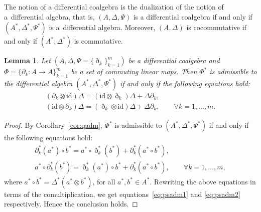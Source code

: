 \documentclass[10pt,a4paper]{amsart}
\numberwithin{equation}{section}
\newtheorem{Lemma}[Theorem]{Lemma}
\newcommand{\id}{\mathrm{id}}
\begin{document}
\begin{Remark}
 The notion of a differential coalgebra is the dualization of the notion of a~differential algebra, that is, $(A, \Delta, \Psi)$ is a differential coalgebra if and only if $(A^*, \Delta^*, \Psi^*)$ is a~differential algebra.
 Moreover, $(A,\Delta)$ is cocommutative if and only if
 $(A^*,\Delta^*)$ is commutative.
\end{Remark}

\begin{Lemma}\label{lem:coadm}
 Let $(A, \Delta, \Psi = \{\eth_k\}_{k=1}^m)$ be a differential coalgebra and
 $\Phi = \{\partial_k\colon A \to A\}_{k=1}^m$ be a set of commuting linear maps.
 Then $\Phi^*$ is admissible to the differential algebra $(A^*, \Delta^*, \Psi^*)$ if and only
 if the following equations hold:
 \begin{gather}
 (\partial_k \otimes \id) \Delta = (\id \otimes \eth_k) \Delta + \Delta \partial_k, \label{eq:psadm1} \\
 (\id \otimes \partial_k) \Delta = (\eth_k \otimes \id) \Delta + \Delta \partial_k, \qquad \forall k=1, \dots, m. \label{eq:psadm2}
 \end{gather}
\end{Lemma}
\begin{proof}
By Corollary~\ref{cor:qadm}, $\Phi^*$ is admissible to $(A^*, \Delta^*, \Psi^*)$ if and only if the following equations hold:
\begin{gather*}
	\partial_k^*(a^*) \circ b^* = a^* \circ \eth_k^*(b^*) + \partial_k^*(a^* \circ b^*), \\
 a^* \circ \partial_k^*(b^*) = \eth_k^*(a^*) \circ b^* + \partial_k^*(a^* \circ b^*), \qquad \forall k=1, \dots, m,
\end{gather*}
where $a^* \circ b^* = \Delta^*(a^*\otimes b^*)$, for all $a^*, b^* \in A^*$.
Rewriting the above equations in terms of the comultiplication, we
get equations~\eqref{eq:psadm1} and \eqref{eq:psadm2} respectively.
Hence the conclusion holds.
\end{proof}
\end{document}
